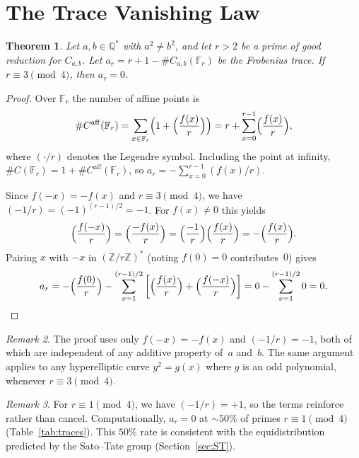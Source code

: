 \documentclass[11pt,a4paper]{article}
\newtheorem{theorem}{Theorem}[section]
\theoremstyle{definition}
\theoremstyle{remark}
\newtheorem{remark}[theorem]{Remark}
\begin{document}
\section{The Trace Vanishing Law}\label{sec:vanish}

\begin{theorem}\label{thm:vanish}
  Let $a, b \in \mathbb{Q}^*$ with $a^2 \ne b^2$, and let
  $r > 2$ be a prime of good reduction for $C_{a,b}$.
  Let $a_r = r + 1 - \#C_{a,b}(\mathbb{F}_r)$ be the Frobenius trace.
  If $r \equiv 3 \pmod{4}$, then $a_r = 0$.
\end{theorem}

\begin{proof}
  Over $\mathbb{F}_r$ the number of affine points is
  \[
    \#C^{\mathrm{aff}}(\mathbb{F}_r)
    = \sum_{x \in \mathbb{F}_r}
    \Bigl(1 + \Bigl(\frac{f(x)}{r}\Bigr)\Bigr)
    = r + \sum_{x=0}^{r-1} \Bigl(\frac{f(x)}{r}\Bigr),
  \]
  where $(\cdot/r)$ denotes the Legendre symbol.
  Including the point at infinity, $\#C(\mathbb{F}_r) = 1 + \#C^{\mathrm{aff}}(\mathbb{F}_r)$,
  so $a_r = -\sum_{x=0}^{r-1} (f(x)/r)$.

  Since $f(-x) = -f(x)$ and $r \equiv 3 \pmod{4}$,
  we have $(-1/r) = (-1)^{(r-1)/2} = -1$.
  For $f(x) \ne 0$ this yields
  \[
    \Bigl(\frac{f(-x)}{r}\Bigr)
    = \Bigl(\frac{-f(x)}{r}\Bigr)
    = \Bigl(\frac{-1}{r}\Bigr)
      \Bigl(\frac{f(x)}{r}\Bigr)
    = -\Bigl(\frac{f(x)}{r}\Bigr).
  \]
  Pairing $x$ with $-x$ in $(\mathbb{Z}/r\mathbb{Z})^*$
  (noting $f(0) = 0$ contributes~$0$) gives
  \[
    a_r = -\Bigl(\frac{f(0)}{r}\Bigr)
    - \sum_{x=1}^{(r-1)/2}
    \left[\Bigl(\frac{f(x)}{r}\Bigr)
    + \Bigl(\frac{f(-x)}{r}\Bigr)\right]
    = 0 - \sum_{x=1}^{(r-1)/2} 0 = 0.\qedhere
  \]
\end{proof}

\begin{remark}\label{rem:generality}
  The proof uses only $f(-x) = -f(x)$ and $(-1/r) = -1$, both of
  which are independent of any additive property of~$a$ and~$b$.
  The same argument applies to any hyperelliptic curve
  $y^2 = g(x)$ where $g$ is an odd polynomial, whenever $r \equiv 3 \pmod 4$.
\end{remark}

\begin{remark}\label{rem:r1}
  For $r \equiv 1 \pmod{4}$, we have $(-1/r) = +1$, so
  the terms reinforce rather than cancel.
  Computationally, $a_r = 0$ at $\sim\!50\%$ of primes
  $r \equiv 1 \pmod{4}$ (Table~\ref{tab:traces}).
  This $50\%$ rate is consistent with the equidistribution
  predicted by the Sato--Tate group (Section~\ref{sec:ST}).
\end{remark}
\end{document}

